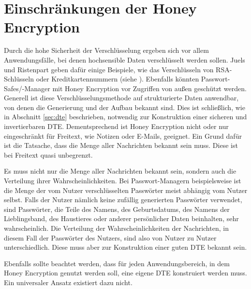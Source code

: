 \section{Einschränkungen der Honey Encryption}
\label{sec:probleme}

Durch die hohe Sicherheit der Verschlüsselung ergeben sich vor allem Anwendungsfälle, bei denen hochsensible Daten verschlüsselt werden sollen. Juels und Ristenpart geben dafür einige Beispiele, wie das Verschlüsseln von RSA-Schlüsseln oder Kreditkartennummern (siehe \cite{EURO2014, IEEE2014}). Ebenfalls könnten Passwort-Safes/-Manager mit Honey Encryption vor Zugriffen von außen geschützt werden. Generell ist diese Verschlüsselungsmethode auf strukturierte Daten anwendbar, von denen die Generierung und der Aufbau bekannt sind. Dies ist schließlich, wie in Abschnitt \ref{sec:dte} beschrieben, notwendig zur Konstruktion einer sicheren und invertierbaren DTE. Dementsprechend ist Honey Encryption nicht oder nur eingeschränkt für Freitext, wie Notizen oder E-Mails, geeignet. Ein Grund dafür ist die Tatsache, dass die Menge aller Nachrichten bekannt sein muss. Diese ist bei Freitext quasi unbegrenzt.

Es muss nicht nur die Menge aller Nachrichten bekannt sein, sondern auch die Verteilung ihrer Wahrscheinlichkeiten. Bei Passwort-Managern beispielsweise ist die Menge der vom Nutzer verschlüsselten Passwörter meist abhängig vom Nutzer selbst. Falls der Nutzer nämlich keine zufällig generierten Passwörter verwendet, sind Passwörter, die Teile des Namens, des Geburtsdatums, des Namens der Lieblingsband, des Haustieres oder anderer persönlicher Daten beinhalten, sehr wahrscheinlich. Die Verteilung der Wahrscheinlichkeiten der Nachrichten, in diesem Fall der Passwörter des Nutzers, sind also von Nutzer zu Nutzer unterschiedlich. Diese muss aber zur Konstruktion einer guten DTE bekannt sein.

Ebenfalls sollte beachtet werden, dass für jeden Anwendungsbereich, in dem Honey Encryption genutzt werden soll, eine eigene DTE konstruiert werden muss. Ein universaler Ansatz existiert dazu nicht.

